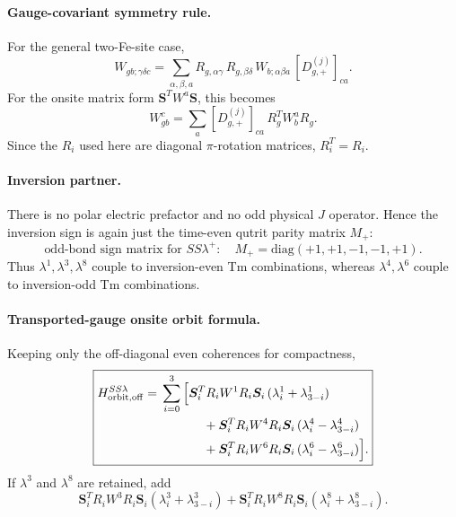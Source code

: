 \documentclass[11pt,a4paper]{article}
\newcommand{\diag}{\mathrm{diag}}
\newcommand{\ve}[1]{\boldsymbol{#1}}
\begin{document}
\paragraph{Gauge-covariant symmetry rule.}
For the general two-Fe-site case,
\begin{equation}
  \boxed{
  W_{gb;\gamma\delta c}
  =\sum_{\alpha,\beta,a}
  R_{g,\alpha\gamma}\,R_{g,\beta\delta}\,
  W_{b;\alpha\beta a}\,
  \left[D_{g,+}^{(j)}\right]_{ca}.}
  \label{eq:SSlambda-covariance}
\end{equation}
For the onsite matrix form $\ve S^TW^a\ve S$, this becomes
\begin{equation}
  \boxed{
  W^c_{gb}=
  \sum_a \left[D_{g,+}^{(j)}\right]_{ca}\,R_g^T W^a_b R_g.}
\end{equation}
Since the $R_i$ used here are diagonal $\pi$-rotation matrices, $R_i^T=R_i$.

\paragraph{Inversion partner.}
There is no polar electric prefactor and no odd physical $J$ operator.  Hence the inversion sign is again just the time-even qutrit parity matrix $M_+$:
\begin{equation}
  \boxed{
  \text{odd-bond sign matrix for }S S\lambda^+:
  \quad M_+=\diag(+1,+1,-1,-1,+1).}
\end{equation}
Thus $\lambda^1,\lambda^3,\lambda^8$ couple to inversion-even Tm combinations, whereas $\lambda^4,\lambda^6$ couple to inversion-odd Tm combinations.

\paragraph{Transported-gauge onsite orbit formula.}
Keeping only the off-diagonal even coherences for compactness,
\begin{equation}
\boxed{
\begin{aligned}
H^{SS\lambda}_{\rm orbit,off}
={}&\sum_{i=0}^{3}
\Big[
\ve S_i^TR_i W^1 R_i\ve S_i\,(\lambda_i^1+\lambda_{3-i}^1)\\
&\hspace{1.2cm}
+\ve S_i^TR_i W^4 R_i\ve S_i\,(\lambda_i^4-\lambda_{3-i}^4)\\
&\hspace{1.2cm}
+\ve S_i^TR_i W^6 R_i\ve S_i\,(\lambda_i^6-\lambda_{3-i}^6)
\Big].
\end{aligned}}
\label{eq:SSlambda-orbit}
\end{equation}
If $\lambda^3$ and $\lambda^8$ are retained, add
\begin{equation}
  \ve S_i^TR_i W^3R_i\ve S_i(\lambda_i^3+\lambda_{3-i}^3)
  +
  \ve S_i^TR_i W^8R_i\ve S_i(\lambda_i^8+\lambda_{3-i}^8).
\end{equation}
\end{document}
